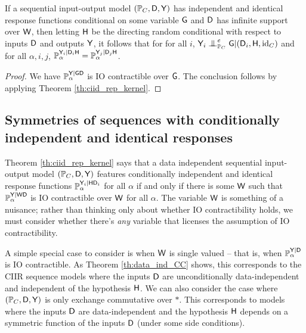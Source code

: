 \begin{corollary}\label{lem:ci_drc}
If a sequential input-output model $(\mathbb{P}_C,\mathsf{D},\mathsf{Y})$ has independent and identical response functions conditional on some variable $\mathsf{G}$ and $\mathsf{D}$ has infinite support over $\mathsf{W}$, then letting $\mathsf{H}$ be the directing random conditional with respect to inputs $\mathsf{D}$ and outputs $\mathsf{Y}$, it follows that for for all $i$, $\RV{Y}_i\CI^e_{\prob{P}_C} \RV{G}|(\RV{D}_i,\RV{H},\text{id}_C)$ and for all $\alpha, i, j$, $\mathbb{P}_\alpha^{\mathsf{Y}_i|\mathsf{D}_i\mathsf{H}}=\mathbb{P}_\alpha^{\mathsf{Y}_j|\mathsf{D}_j\mathsf{H}}$.
\end{corollary}

\begin{proof}
We have $\mathbb{P}_\alpha^{\mathsf{Y}|\mathsf{G}\mathsf{D}}$ is IO contractible over $\mathsf{G}$. The conclusion follows by applying Theorem \ref{th:ciid_rep_kernel}.
\end{proof}

\subsection[Symmetries of CIIR sequences]{Symmetries of sequences with conditionally independent and identical responses}\label{sec:data_independent_actions}

Theorem \ref{th:ciid_rep_kernel} says that a data independent sequential input-output model $(\mathbb{P}_C,\mathsf{D},\mathsf{Y})$ features conditionally independent and identical response functions $\mathbb{P}_\alpha^{\mathsf{Y}_i|\mathsf{HD}_i}$ for all $\alpha$ if and only if there is some $\mathsf{W}$ such that $\mathbb{P}_\alpha^{\mathsf{Y}|\mathsf{WD}}$ is IO contractible over $\mathsf{W}$ for all $\alpha$. The variable $\mathsf{W}$ is something of a nuisance; rather than thinking only about whether IO contractibility holds, we must consider whether there's \emph{any} variable that licenses the assumption of IO contractibility.

A simple special case to consider is when $\mathsf{W}$ is single valued -- that is, when $\mathbb{P}_\alpha^{\mathsf{Y}|\mathsf{D}}$ is IO contractible. As Theorem \ref{th:data_ind_CC} shows, this corresponds to the CIIR sequence models where the inputs $\mathsf{D}$ are unconditionally data-independent and independent of the hypothesis $\mathsf{H}$. We can also consider the case where $(\mathbb{P}_C, \mathsf{D},\mathsf{Y})$ is only exchange commutative over $*$. This corresponds to models where the inputs $\mathsf{D}$ are data-independent and the hypothesis $\mathsf{H}$ depends on a symmetric function of the inputs $\mathsf{D}$ (under some side conditions).

